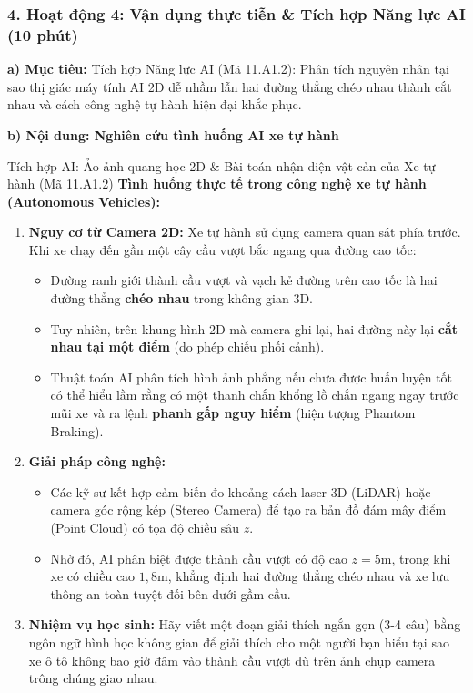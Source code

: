 \documentclass[12pt, a4paper]{article}
\begin{document}
\subsubsection*{4. Hoạt động 4: Vận dụng thực tiễn & Tích hợp Năng lực AI (10 phút)}

\noindent \textbf{a) Mục tiêu:}
Tích hợp Năng lực AI (Mã 11.A1.2): Phân tích nguyên nhân tại sao thị giác máy tính AI 2D dễ nhầm lẫn hai đường thẳng chéo nhau thành cắt nhau và cách công nghệ tự hành hiện đại khắc phục.

\noindent \textbf{b) Nội dung: Nghiên cứu tình huống AI xe tự hành}
\begin{aibox}{Tích hợp AI: Ảo ảnh quang học 2D \& Bài toán nhận diện vật cản của Xe tự hành (Mã 11.A1.2)}
\textbf{Tình huống thực tế trong công nghệ xe tự hành (Autonomous Vehicles):}
\begin{enumerate}[leftmargin=0.6cm]
    \item \textbf{Nguy cơ từ Camera 2D:} Xe tự hành sử dụng camera quan sát phía trước. Khi xe chạy đến gần một cây cầu vượt bắc ngang qua đường cao tốc:
    \begin{itemize}
        \item Đường ranh giới thành cầu vượt và vạch kẻ đường trên cao tốc là hai đường thẳng \textbf{chéo nhau} trong không gian 3D.
        \item Tuy nhiên, trên khung hình $2\text{D}$ mà camera ghi lại, hai đường này lại \textbf{cắt nhau tại một điểm} (do phép chiếu phối cảnh).
        \item Thuật toán AI phân tích hình ảnh phẳng nếu chưa được huấn luyện tốt có thể hiểu lầm rằng có một thanh chắn khổng lồ chắn ngang ngay trước mũi xe và ra lệnh \textbf{phanh gấp nguy hiểm} (hiện tượng Phantom Braking).
    \end{itemize}
    \item \textbf{Giải pháp công nghệ:}
    \begin{itemize}
        \item Các kỹ sư kết hợp cảm biến đo khoảng cách laser 3D (LiDAR) hoặc camera góc rộng kép (Stereo Camera) để tạo ra bản đồ đám mây điểm (Point Cloud) có tọa độ chiều sâu $z$.
        \item Nhờ đó, AI phân biệt được thành cầu vượt có độ cao $z = 5\text{m}$, trong khi xe có chiều cao $1{,}8\text{m}$, khẳng định hai đường thẳng chéo nhau và xe lưu thông an toàn tuyệt đối bên dưới gầm cầu.
    \end{itemize}
    \item \textbf{Nhiệm vụ học sinh:} Hãy viết một đoạn giải thích ngắn gọn (3-4 câu) bằng ngôn ngữ hình học không gian để giải thích cho một người bạn hiểu tại sao xe ô tô không bao giờ đâm vào thành cầu vượt dù trên ảnh chụp camera trông chúng giao nhau.
\end{enumerate}
\end{aibox}
\end{document}
